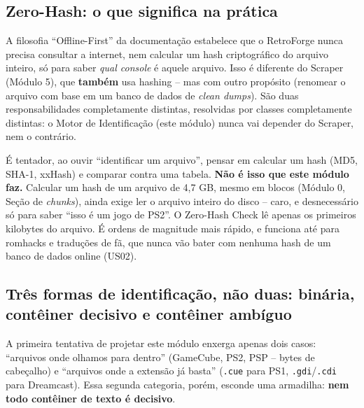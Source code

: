 \subsection{Zero-Hash: o que significa na prática}

A filosofia ``Offline-First'' da documentação estabelece que o RetroForge nunca precisa consultar a internet, nem calcular um hash criptográfico do arquivo inteiro, só para saber \textit{qual console} é aquele arquivo. Isso é diferente do Scraper (Módulo 5), que \textbf{também} usa hashing -- mas com outro propósito (renomear o arquivo com base em um banco de dados de \textit{clean dumps}). São duas responsabilidades completamente distintas, resolvidas por classes completamente distintas: o Motor de Identificação (este módulo) nunca vai depender do Scraper, nem o contrário.

\begin{CaixaAlerta}
É tentador, ao ouvir ``identificar um arquivo'', pensar em calcular um hash (MD5, SHA-1, xxHash) e comparar contra uma tabela. \textbf{Não é isso que este módulo faz.} Calcular um hash de um arquivo de 4,7 GB, mesmo em blocos (Módulo 0, Seção de \textit{chunks}), ainda exige ler o arquivo inteiro do disco -- caro, e desnecessário só para saber ``isso é um jogo de PS2''. O Zero-Hash Check lê apenas os primeiros kilobytes do arquivo. É ordens de magnitude mais rápido, e funciona até para romhacks e traduções de fã, que nunca vão bater com nenhuma hash de um banco de dados online (US02).
\end{CaixaAlerta}

\subsection{Três formas de identificação, não duas: binária, contêiner decisivo e contêiner ambíguo}
\label{sec:tres-formas}

A primeira tentativa de projetar este módulo enxerga apenas dois casos: ``arquivos onde olhamos para dentro'' (GameCube, PS2, PSP -- bytes de cabeçalho) e ``arquivos onde a extensão já basta'' (\texttt{.cue} para PS1, \texttt{.gdi}/\texttt{.cdi} para Dreamcast). Essa segunda categoria, porém, esconde uma armadilha: \textbf{nem todo contêiner de texto é decisivo}.

